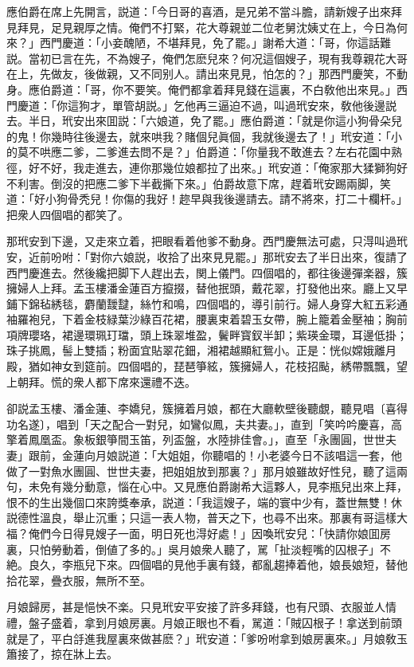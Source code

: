 應伯爵在席上先開言，説道：「今日哥的喜酒，是兄弟不當斗膽，請新嫂子出來拜見拜見，足見親厚之情。俺們不打緊，花大尊親並二位老舅沈姨丈在上，今日為何來？」西門慶道：「小妾醜陋，不堪拜見，免了罷。」謝希大道：「哥，你這話難説。當初已言在先，不為嫂子，俺們怎麽兒來？何况這個嫂子，現有我尊親花大哥在上，先做友，後做親，又不同别人。請出來見見，怕怎的？」那西門慶笑，不動身。應伯爵道：「哥，你不要笑。俺們都拿着拜見錢在這裏，不白敎他出來見。」西門慶道：「你這狗才，單管胡説。」乞他再三逼迫不過，叫過玳安來，敎他後邊説去。半日，玳安出來囬説：「六娘道，免了罷。」應伯爵道：「就是你這小狗骨朵兒的鬼！你幾時往後邊去，就來哄我？賭個兒眞個，我就後邊去了！」玳安道：「小的莫不哄應二爹，二爹進去問不是？」伯爵道：「你量我不敢進去？左右花園中熟徑，好不好，我走進去，連你那幾位娘都拉了出來。」玳安道：「俺家那大猱獅狗好不利害。倒沒的把應二爹下半截撕下來。」伯爵故意下席，趕着玳安踢兩脚，笑道：「好小狗骨秃兒！你傷的我好！趂早與我後邊請去。請不將來，打二十欄杆。」把衆人四個唱的都笑了。

那玳安到下邊，又走來立着，把眼看着他爹不動身。西門慶無法可處，只淂叫過玳安，近前吩咐：「對你六娘説，收拾了出來見見罷。」那玳安去了半日出來，復請了西門慶進去。然後纔把脚下人趕出去，関上儀門。四個唱的，都往後邊彈楽器，簇擁婦人上拜。孟玉樓潘金蓮百方攛掇，替他抿頭，戴花翠，打發他出來。廳上又早鋪下錦毡綉毯，麝蘭靉靆，絲竹和鳴，四個唱的，導引前行。婦人身穿大紅五彩通袖羅袍兒，下着金枝緑葉沙綠百花裙，腰裏束着碧玉女帶，腕上籠着金壓袖；胸前項牌瓔珞，裙邊環珮玎璫，頭上珠翠堆盈，鬢畔寳釵半卸；紫瑛金環，耳邊低掛；珠子挑鳳，髻上雙插；粉面宜貼翠花鈿，湘裙越顯紅鴛小。正是：恍似嫦娥離月殿，猶如神女到筵前。四個唱的，琵琶箏絃，簇擁婦人，花枝招颭，綉帶飄飄，望上朝拜。慌的衆人都下席來還禮不迭。

卻説孟玉樓、潘金蓮、李嬌兒，簇擁着月娘，都在大廳軟壁後聽覷，聽見唱〔喜得功名遂〕，唱到「天之配合一對兒，如鸞似鳳，夫共妻。」，直到「笑吟吟慶喜，高擎着鳳凰盃。象板銀箏間玉笛，列盃盤，水陸排佳會。」，直至「永團圓，世世夫妻」跟前，金蓮向月娘説道：「大姐姐，你聽唱的！小老婆今日不該唱這一套，他做了一對魚水團圓、世世夫妻，把姐姐放到那裏？」那月娘雖故好性兒，聽了這兩句，未免有幾分動意，惱在心中。又見應伯爵謝希大這夥人，見李瓶兒出來上拜，恨不的生出幾個口來誇獎奉承，説道：「我這嫂子，端的寰中少有，蓋世無雙！休説德性溫良，舉止沉重；只這一表人物，普天之下，也尋不出來。那裏有哥這樣大福？俺們今日得見嫂子一面，明日死也淂好處！」因喚玳安兒：「快請你娘囬房裏，只怕勞動着，倒値了多的。」吳月娘衆人聽了，駡「扯淡輕嘴的囚根子」不絶。良久，李瓶兒下來。四個唱的見他手裏有錢，都亂趨捧着他，娘長娘短，替他拾花翠，疊衣服，無所不至。

月娘歸房，甚是悒怏不楽。只見玳安平安接了許多拜錢，也有尺頭、衣服並人情禮，盤子盛着，拿到月娘房裏。月娘正眼也不看，駡道：「賊囚根子！拿送到前頭就是了，平白㧱進我屋裏來做甚麽？」玳安道：「爹吩咐拿到娘房裏來。」月娘敎玉簫接了，掠在牀上去。

